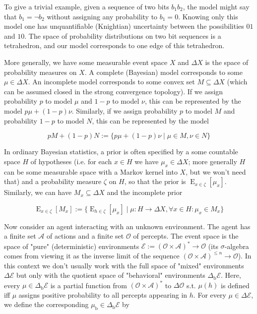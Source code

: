 \documentclass[a4paper]{article}
\DeclareMathOperator{\E}{E}
\newcommand{\SP}[1]{\Delta #1}
\newcommand{\Act}{\mathcal{A}}
\newcommand{\Per}{\mathcal{O}}
\newcommand{\His}{(\Per \times \Act)^*}
\newcommand{\Env}{\mathcal{E}}
\newcommand{\Beh}{\Delta_{\operatorname{b}}}
\newcommand{\EnvB}{\Beh\Env}
\begin{document}
To give a trivial example, given a sequence of two bits $b_1b_2$, the model might say that $b_1=\lnot b_2$ without assigning any probability to $b_1=0$. Knowing only this model one has unquantifiable (Knightian) uncertainty between the possibilities $01$ and $10$. The space of probability distributions on two bit sequences is a tetrahedron, and our model corresponds to one edge of this tetrahedron.

More generally, we have some measurable event space ${X}$ and ${\SP{X}}$ is the space of probability measures on ${X}$. A complete (Bayesian) model corresponds to some ${\mu \in \SP{X}}$. An incomplete model corresponds to some convex set ${M \subseteq \SP{X}}$ (which can be assumed closed in the strong convergence topology). If we assign probability ${p}$ to model ${\mu}$ and ${1-p}$ to model ${\nu}$, this can be represented by the model ${p \mu + (1-p) \nu}$. Similarly, if we assign probability ${p}$ to model ${M}$ and probability ${1-p}$ to model ${N}$, this can be represented by the model 

$${pM+(1-p)N:=\{p \mu + (1-p) \nu \mid \mu \in M, \nu \in N\}}$$

In ordinary Bayesian statistics, a prior is often specified by a some countable space ${H}$ of hypotheses (i.e. for each ${x \in H}$ we have ${\mu_x \in \SP{X}}$; more generally ${H}$ can be some measurable space with a Markov kernel into ${X}$, but we won't need that) and a probability measure ${\zeta}$ on ${H}$, so that the prior is ${\E_{x \in \zeta}[\mu_x]}$. Similarly, we can have ${M_x \subseteq \SP{X}}$ and the incomplete prior

$${\E_{x \in \zeta}[M_x]:=\{\E_{h \in \zeta}[\mu_x] \mid \mu: H \rightarrow \SP{X}, \forall x \in H: \mu_x \in M_x\}}$$

Now consider an agent interacting with an unknown environment. The agent has a finite set ${\Act}$ of actions and a finite set ${\Per}$ of percepts. The event space is the space of "pure" (deterministic) environments ${\Env:=\His \rightarrow \Per}$ (its ${\sigma}$-algebra comes from viewing it as the inverse limit of the sequence ${(\Per \times \Act)^{\leq n} \rightarrow \Per}$). In this context we don't usually work with the full space of "mixed" environments ${\SP{\Env}}$ but only with the quotient space of "behavioral" environments  ${\EnvB}$. Here, every ${\mu \in \EnvB}$ is a partial function from ${\His}$ to ${\SP{\Per}}$ s.t. ${\mu(h)}$ is defined iff ${\mu}$ assigns positive probability to all percepts appearing in ${h}$. For every ${\mu \in \SP{\Env}}$, we define the corresponding ${\mu_{\operatorname{b}} \in \EnvB}$ by
\end{document}
